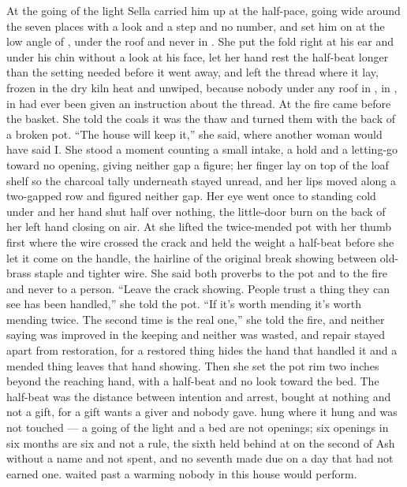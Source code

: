 At the going of the light Sella carried him up at the half-pace, going wide around the seven places with a look and a step and no number, and set him on  at the low angle of , under the roof and never in . She put the fold right at his ear and under his chin without a look at his face, let her hand rest the half-beat longer than the setting needed before it went away, and left the thread where it lay, frozen in the dry kiln heat and unwiped, because nobody under any roof in , in , in  had ever been given an instruction about the thread. At  the fire came before the basket. She told the coals it was the thaw and turned them with the back of a broken pot. “The house will keep it,” she said, where another woman would have said I. She stood a moment counting a small intake, a hold and a letting-go toward no opening, giving neither gap a figure; her finger lay on top of the loaf shelf so the charcoal tally underneath stayed unread, and her lips moved along a two-gapped row and figured neither gap. Her eye went once to  standing cold under  and her hand shut half over nothing, the little-door burn on the back of her left hand closing on air. At  she lifted the twice-mended pot with her thumb first where the wire crossed the crack and held the weight a half-beat before she let it come on the handle, the hairline of the original break showing between old-brass staple and tighter wire. She said both proverbs to the pot and to the fire and never to a person. “Leave the crack showing. People trust a thing they can see has been handled,” she told the pot. “If it's worth mending it's worth mending twice. The second time is the real one,” she told the fire, and neither saying was improved in the keeping and neither was wasted, and repair stayed apart from restoration, for a restored thing hides the hand that handled it and a mended thing leaves that hand showing. Then she set the pot rim two inches beyond the reaching hand, with a half-beat and no look toward the bed. The half-beat was the distance between intention and arrest, bought at nothing and not a gift, for a gift wants a giver and nobody gave.  hung where it hung and was not touched --- a going of the light and a bed are not openings; six openings in six months are six and not a rule, the sixth held behind at  on the second of Ash without a name and not spent, and no seventh made due on a day that had not earned one.  waited past a warming nobody in this house would perform.

